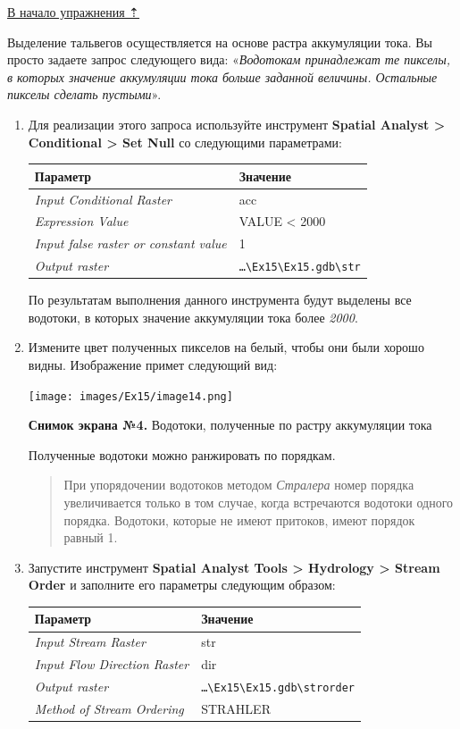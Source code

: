 \documentclass[12pt,]{book}
\begin{document}
\protect\hyperlink{dem}{В начало упражнения ⇡}

Выделение тальвегов осуществляется на основе растра аккумуляции тока. Вы просто задаете запрос следующего вида: «\emph{Водотокам принадлежат те пикселы, в которых значение аккумуляции тока больше заданной величины. Остальные пикселы сделать пустыми}».

\begin{enumerate}
\def\labelenumi{\arabic{enumi}.}
\item
  Для реализации этого запроса используйте инструмент \textbf{Spatial Analyst \textgreater{} Conditional \textgreater{} Set Null} со следующими параметрами:

  \begin{longtable}[]{@{}ll@{}}
  \toprule
  Параметр & Значение\tabularnewline
  \midrule
  \endhead
  \emph{Input Conditional Raster} & acc\tabularnewline
  \emph{Expression Value} & VALUE \textless{} 2000\tabularnewline
  \emph{Input false raster or constant value} & 1\tabularnewline
  \emph{Output raster} & \texttt{\ldots{}\textbackslash{}Ex15\textbackslash{}Ex15.gdb\textbackslash{}str}\tabularnewline
  \bottomrule
  \end{longtable}

  По результатам выполнения данного инструмента будут выделены все водотоки, в которых значение аккумуляции тока более \emph{2000}.
\item
  Измените цвет полученных пикселов на белый, чтобы они были хорошо видны. Изображение примет следующий вид:

  \texttt{[image: images/Ex15/image14.png]}

  \textbf{Снимок экрана №4.} Водотоки, полученные по растру аккумуляции тока

  Полученные водотоки можно ранжировать по порядкам.

  \begin{quote}
  При упорядочении водотоков методом \emph{Стралера} номер порядка увеличивается только в том случае, когда встречаются водотоки одного порядка. Водотоки, которые не имеют притоков, имеют порядок равный 1.
  \end{quote}
\item
  Запустите инструмент \textbf{Spatial Analyst Tools \textgreater{} Hydrology \textgreater{} Stream Order} и заполните его параметры следующим образом:

  \begin{longtable}[]{@{}ll@{}}
  \toprule
  Параметр & Значение\tabularnewline
  \midrule
  \endhead
  \emph{Input Stream Raster} & str\tabularnewline
  \emph{Input Flow Direction Raster} & dir\tabularnewline
  \emph{Output raster} & \texttt{\ldots{}\textbackslash{}Ex15\textbackslash{}Ex15.gdb\textbackslash{}strorder}\tabularnewline
  \emph{Method of Stream Ordering} & STRAHLER\tabularnewline
  \bottomrule
  \end{longtable}


\end{enumerate}
\end{document}
